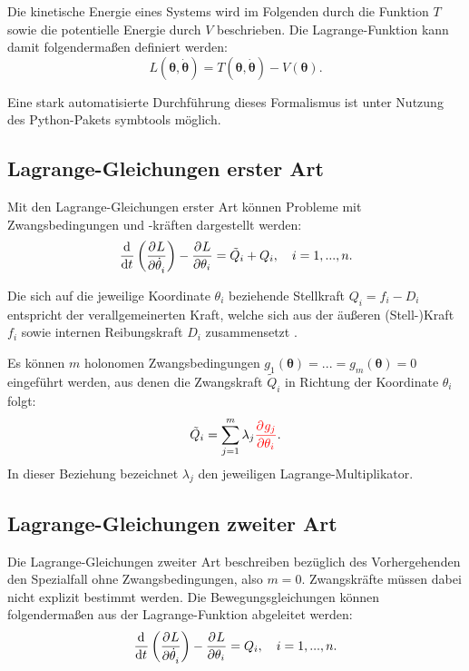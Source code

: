 Die kinetische Energie eines Systems wird im Folgenden durch die Funktion $T$ sowie die potentielle Energie durch $V$ beschrieben. Die Lagrange-Funktion kann damit folgendermaßen definiert werden:
\begin{equation}
L(\boldsymbol{\theta}, \dot{\boldsymbol{\theta}}) = T(\boldsymbol{\theta}, \dot{\boldsymbol{\theta}}) - V(\boldsymbol{\theta}).
\end{equation}

Eine stark automatisierte Durchführung dieses Formalismus ist unter Nutzung des Python-Pakets symbtools \cite{symbtools} möglich.

\subsection{Lagrange-Gleichungen erster Art}
\label{sec:Lagrange1_theory}

Mit den Lagrange-Gleichungen erster Art können Probleme mit Zwangsbedingungen und -kräften dargestellt werden:
\begin{equation}
	\frac{\mathrm{d}^{}}{\mathrm{d}{t}^{}}\left(\frac{\partial^{}L}{\partial{\dot{\theta}_i}^{}} \right) - \frac{\partial^{}L}{\partial{\theta_i}^{}} = \tilde{Q}_i + Q_i, \quad i = 1, ..., n.
\end{equation}

Die sich auf die jeweilige Koordinate $\theta_i$ beziehende Stellkraft $Q_i = f_i - D_i$ entspricht der verallgemeinerten Kraft, welche sich aus der äußeren (Stell-)Kraft $f_i$ sowie internen Reibungskraft $D_i$ zusammensetzt \cite[S. 49]{Lagrange}.

Es können $m$ holonomen Zwangsbedingungen $g_1(\boldsymbol{\theta}) = ... = g_m(\boldsymbol{\theta}) = 0$ eingeführt werden, aus denen die Zwangskraft $\tilde{Q}_i$ in Richtung der Koordinate $\theta_i$ folgt:
\begin{equation}
	\tilde{Q}_i = \sum_{j = 1}^m \lambda_j \textcolor{red}{\frac{\partial^{}g_j}{\partial{\theta_i}^{}}}.
\end{equation}
In dieser Beziehung bezeichnet $\lambda_j$ den jeweiligen Lagrange-Multiplikator.

\subsection{Lagrange-Gleichungen zweiter Art}
\label{sec:Lagrange2_theory}
Die Lagrange-Gleichungen zweiter Art beschreiben bezüglich des Vorhergehenden den Spezialfall ohne Zwangsbedingungen, also $m = 0$. Zwangskräfte müssen dabei nicht explizit bestimmt werden. Die Bewegungsgleichungen können folgendermaßen aus der Lagrange-Funktion abgeleitet werden:
\begin{equation}
	\frac{\mathrm{d}^{}}{\mathrm{d}{t}^{}}\left(\frac{\partial^{}L}{\partial{\dot{\theta}_i}^{}} \right) - \frac{\partial^{}L}{\partial{\theta_i}^{}} = Q_i, \quad i = 1, ..., n.
\end{equation} 

